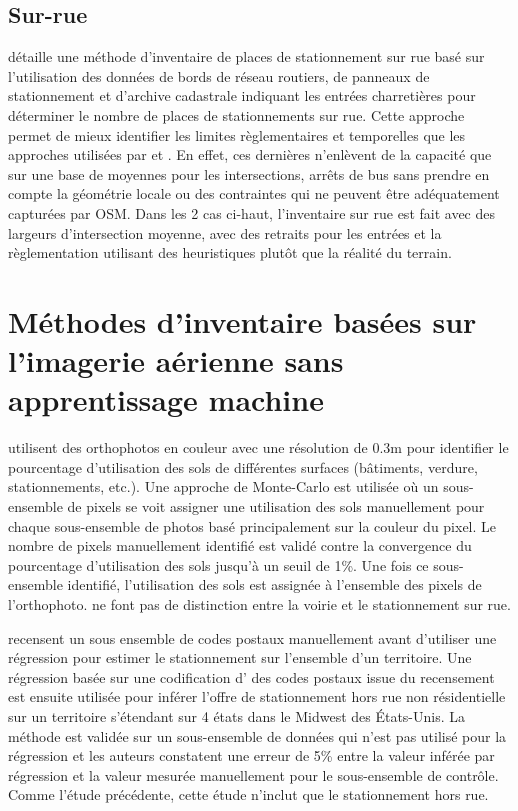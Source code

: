   \subsection{Sur-rue}
  \textcite{Bourdeau:MethodologieAnalyse:2014} détaille une méthode d'inventaire de places de stationnement sur rue basé sur l'utilisation des données de bords de réseau routiers, de panneaux de stationnement et d'archive cadastrale indiquant les entrées charretières pour déterminer le nombre de places de stationnements sur rue. Cette approche permet de mieux identifier les limites règlementaires et temporelles que les approches utilisées par \textcite{Chester:InventoryingSan:2022} et \textcite{Scharnhorst:QuantifiedParking:2018}. En effet, ces dernières n'enlèvent de la capacité que sur une base de moyennes pour les intersections, arrêts de bus sans prendre en compte la géométrie locale ou des contraintes qui ne peuvent être adéquatement capturées par \ac{OSM}. Dans les 2 cas ci-haut, l'inventaire sur rue est fait avec des largeurs d'intersection moyenne, avec des retraits pour les entrées et la règlementation utilisant des heuristiques plutôt que la réalité du terrain. \par
\section{Méthodes d'inventaire basées sur l'imagerie aérienne sans apprentissage machine}
  \textcite{Akbari:AnalyzingLand:2003} utilisent des orthophotos en couleur avec une résolution de 0.3m pour identifier le pourcentage d'utilisation des sols de différentes surfaces (bâtiments, verdure, stationnements, etc.). Une approche de Monte-Carlo est utilisée où un sous-ensemble de pixels se voit assigner une utilisation des sols manuellement pour chaque sous-ensemble de photos basé principalement sur la couleur du pixel. Le nombre de pixels manuellement identifié est validé contre la convergence du pourcentage d'utilisation des sols jusqu'à un seuil de 1\%. Une fois ce sous-ensemble identifié, l'utilisation des sols est assignée à l'ensemble des pixels de l'orthophoto. \citeauthor{Akbari:AnalyzingLand:2003} ne font pas de distinction entre la voirie et le stationnement sur rue.\par
  \textcite{Davis:EstimatingParking:2010} recensent un sous ensemble de codes postaux manuellement avant d'utiliser une régression pour estimer le stationnement sur l'ensemble d'un territoire. Une régression basée sur une codification d' \fg{} des codes postaux issue du recensement est ensuite utilisée pour inférer l'offre de stationnement hors rue non résidentielle sur un territoire s'étendant sur 4 états dans le Midwest des États-Unis. La méthode est validée sur un sous-ensemble de données qui n'est pas utilisé pour la régression et les auteurs constatent une erreur de 5\% entre la valeur inférée par régression et la valeur mesurée manuellement pour le sous-ensemble de contrôle. Comme l'étude précédente, cette étude n'inclut que le stationnement hors rue. \par
